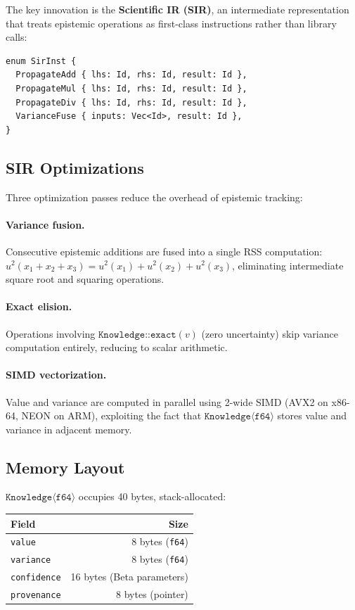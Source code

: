 \documentclass[acmsmall,screen,review,anonymous]{acmart}
\newcommand{\know}[1]{\texttt{Knowledge}\langle #1 \rangle}
\begin{document}
The key innovation is the \textbf{Scientific IR (SIR)}, an intermediate
representation that treats epistemic operations as first-class instructions
rather than library calls:

\begin{lstlisting}[caption={SIR epistemic instructions}]
enum SirInst {
  PropagateAdd { lhs: Id, rhs: Id, result: Id },
  PropagateMul { lhs: Id, rhs: Id, result: Id },
  PropagateDiv { lhs: Id, rhs: Id, result: Id },
  VarianceFuse { inputs: Vec<Id>, result: Id },
}
\end{lstlisting}

\subsection{SIR Optimizations}

Three optimization passes reduce the overhead of epistemic tracking:

\paragraph{Variance fusion.}
Consecutive epistemic additions are fused into a single RSS computation:
$u^2(x_1 + x_2 + x_3) = u^2(x_1) + u^2(x_2) + u^2(x_3)$,
eliminating intermediate square root and squaring operations.

\paragraph{Exact elision.}
Operations involving $\texttt{Knowledge::exact}(v)$ (zero uncertainty)
skip variance computation entirely, reducing to scalar arithmetic.

\paragraph{SIMD vectorization.}
Value and variance are computed in parallel using 2-wide SIMD
(AVX2 on x86-64, NEON on ARM), exploiting the fact that
$\know{\texttt{f64}}$ stores value and variance in adjacent memory.

\subsection{Memory Layout}

$\know{\texttt{f64}}$ occupies 40 bytes, stack-allocated:

\begin{center}
\begin{tabular}{lr}
\toprule
Field & Size \\
\midrule
\texttt{value} & 8 bytes (\texttt{f64}) \\
\texttt{variance} & 8 bytes (\texttt{f64}) \\
\texttt{confidence} & 16 bytes (Beta parameters) \\
\texttt{provenance} & 8 bytes (pointer) \\
\bottomrule
\end{tabular}
\end{center}
\end{document}
